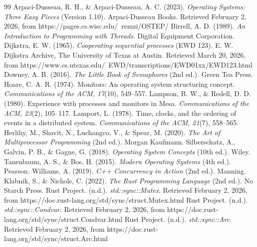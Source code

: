 \documentclass[11pt]{article}
\begin{document}
\begin{thebibliography}{99}
 Arpaci-Dusseau, R. H., \& Arpaci-Dusseau, A. C. (2023). \textit{Operating Systems: Three Easy Pieces} (Version 1.10). Arpaci-Dusseau Books. Retrieved February 2, 2026, from https://pages.cs.wisc.edu/~remzi/OSTEP/
 Birrell, A. D. (1989). \textit{An Introduction to Programming with Threads}. Digital Equipment Corporation.
 Dijkstra, E. W. (1965). \textit{Cooperating sequential processes} (EWD 123). E. W. Dijkstra Archive, The University of Texas at Austin. Retrieved March 20, 2026, from https://www.cs.utexas.edu/~EWD/transcriptions/EWD01xx/EWD123.html
 Downey, A. B. (2016). \textit{The Little Book of Semaphores} (2nd ed.). Green Tea Press.
 Hoare, C. A. R. (1974). Monitors: An operating system structuring concept. \textit{Communications of the ACM, 17}(10), 549--557.
 Lampson, B. W., \& Redell, D. D. (1980). Experience with processes and monitors in Mesa. \textit{Communications of the ACM, 23}(2), 105--117.
 Lamport, L. (1978). Time, clocks, and the ordering of events in a distributed system. \textit{Communications of the ACM, 21}(7), 558--565.
 Herlihy, M., Shavit, N., Luchangco, V., \& Spear, M. (2020). \textit{The Art of Multiprocessor Programming} (2nd ed.). Morgan Kaufmann.
 Silberschatz, A., Galvin, P. B., \& Gagne, G. (2018). \textit{Operating System Concepts} (10th ed.). Wiley.
 Tanenbaum, A. S., \& Bos, H. (2015). \textit{Modern Operating Systems} (4th ed.). Pearson.
 Williams, A. (2019). \textit{C++ Concurrency in Action} (2nd ed.). Manning.
 Klabnik, S., \& Nichols, C. (2022). \textit{The Rust Programming Language} (2nd ed.). No Starch Press.
 Rust Project. (n.d.). \textit{std::sync::Mutex}. Retrieved February 2, 2026, from https://doc.rust-lang.org/std/sync/struct.Mutex.html
 Rust Project. (n.d.). \textit{std::sync::Condvar}. Retrieved February 2, 2026, from https://doc.rust-lang.org/std/sync/struct.Condvar.html
 Rust Project. (n.d.). \textit{std::sync::Arc}. Retrieved February 2, 2026, from https://doc.rust-lang.org/std/sync/struct.Arc.html

\end{thebibliography}
\end{document}
